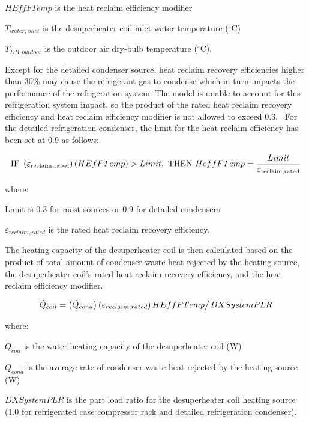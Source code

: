 \(HEffFTemp\) is the heat reclaim efficiency modifier

\({T_{water,inlet}}\) is the desuperheater coil inlet water temperature (\(^{\circ}\)C)

\({T_{DB,outdoor}}\) is the outdoor air dry-bulb temperature (\(^{\circ}\)C).

Except for the detailed condenser source, heat reclaim recovery efficiencies higher than 30\% may cause the refrigerant gas to condense which in turn impacts the performance of the refrigeration system. The model is unable to account for this refrigeration system impact, so the product of the rated heat reclaim recovery efficiency and heat reclaim efficiency modifier is not allowed to exceed 0.3.~ For the detailed refrigeration condenser, the limit for the heat reclaim efficiency has been set at 0.9 as follows:

\begin{equation}
{\rm{IF~}}\left( {{\varepsilon_{{\rm{reclaim,rated}}}}} \right)\left( {HEfFTemp} \right) > Limit,{\rm{~THEN~}}HeffFTemp = \frac{{Limit}}{{{\varepsilon_{{\rm{reclaim,rated}}}}}}
\end{equation}

where:

Limit is 0.3 for most sources or 0.9 for detailed condensers

\({\varepsilon_{reclaim,rated}}\) is the rated heat reclaim recovery efficiency.

The heating capacity of the desuperheater coil is then calculated based on the product of total amount of condenser waste heat rejected by the heating source, the desuperheater coil's rated heat reclaim recovery efficiency, and the heat reclaim efficiency modifier.

\begin{equation}
{\dot Q_{coil}} = {{\left( {{{\dot Q}_{cond}}} \right)\left( {{\varepsilon_{reclaim,rated}}} \right)HEffFTemp} \mathord{\left/ {\vphantom {{\left( {{{\dot Q}_{cond}}} \right)\left( {{\varepsilon_{reclaim,rated}}} \right)HEffFTemp} {DXSystemPLR}}} \right. } {DXSystemPLR}}
\end{equation}

where:

\({\dot Q_{coil}}\) is the water heating capacity of the desuperheater coil (W)

\({\dot Q_{cond}}\) is the average rate of condenser waste heat rejected by the heating source (W)

\(DXSystemPLR\) is the part load ratio for the desuperheater coil heating source (1.0 for refrigerated case compressor rack and detailed refrigeration condenser).

